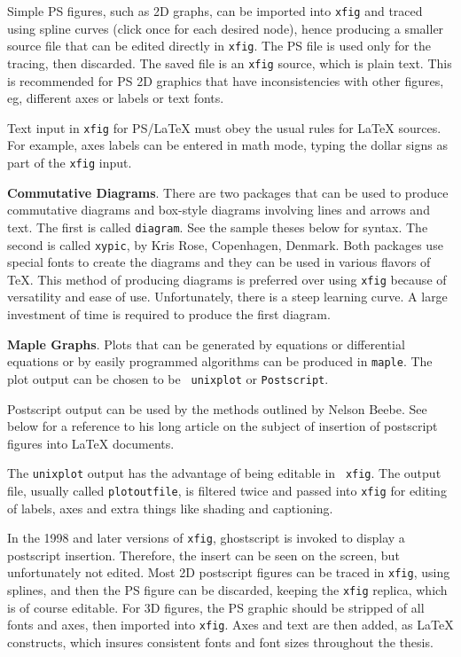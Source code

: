 Simple PS figures, such as 2D graphs, can be imported into {\tt xfig}
and traced using spline curves (click once for each desired node), hence
producing a smaller source file that can be edited directly in {\tt xfig}.
The PS file is used only for the tracing, then discarded. The saved file
is an {\tt xfig} source, which is plain text. This is recommended for
PS 2D graphics that have inconsistencies with other figures, eg, different
axes or labels or text fonts.

Text input in {\tt xfig} for PS/LaTeX must obey the usual rules for
\LaTeX{} sources. For example, axes labels can be entered in math mode,
typing the dollar signs as part of the {\tt xfig} input.


{\bf Commutative Diagrams}. There are two packages that can be used to
produce commutative diagrams and box-style diagrams involving lines and
arrows and text. The first is called {\tt diagram}. See the sample
theses below for syntax. The second is called {\tt xypic}, by Kris Rose,
Copenhagen, Denmark. Both packages use special fonts to create the
diagrams and they can be used in various flavors of \TeX. This method of
producing diagrams is preferred over using {\tt xfig} because of
versatility and ease of use. Unfortunately, there is a steep learning
curve. A large investment of time is required to produce the first
diagram.

{\bf Maple Graphs}. Plots that can be generated by equations or
differential equations or by easily programmed algorithms can be
produced in {\tt maple}. The plot output can be chosen to be {\tt
unixplot} or {\tt Postscript}.

Postscript output can be used by the methods outlined by Nelson Beebe.
See below for a reference to his long article on the subject of
insertion of postscript figures into \LaTeX{} documents.

The {\tt unixplot} output has the advantage of being editable in {\tt
xfig}. The output file, usually called {\tt plotoutfile}, is filtered
twice and passed into {\tt xfig} for editing of labels, axes and extra
things like shading and captioning.

In the 1998 and later versions of {\tt xfig}, ghostscript is invoked to
display a postscript insertion. Therefore, the insert can be seen on the
screen, but unfortunately not edited. Most 2D postscript figures can be
traced in {\tt xfig}, using splines, and then the PS figure can be discarded,
keeping the {\tt xfig} replica, which is of course editable. For 3D figures,
the PS graphic should be stripped of all fonts and axes, then imported
into {\tt xfig}. Axes and text are then added, as \LaTeX{} constructs,
which insures consistent fonts and font sizes throughout the thesis.


